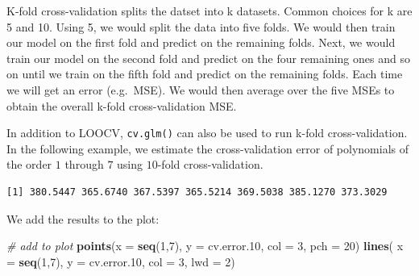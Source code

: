 \documentclass[]{article}
\newenvironment{Shaded}{\begin{snugshade}}{\end{snugshade}}
\newcommand{\CommentTok}[1]{\textcolor[rgb]{0.56,0.35,0.01}{\textit{#1}}}
\newcommand{\ControlFlowTok}[1]{\textcolor[rgb]{0.13,0.29,0.53}{\textbf{#1}}}
\newcommand{\DataTypeTok}[1]{\textcolor[rgb]{0.13,0.29,0.53}{#1}}
\newcommand{\DecValTok}[1]{\textcolor[rgb]{0.00,0.00,0.81}{#1}}
\newcommand{\FloatTok}[1]{\textcolor[rgb]{0.00,0.00,0.81}{#1}}
\newcommand{\KeywordTok}[1]{\textcolor[rgb]{0.13,0.29,0.53}{\textbf{#1}}}
\newcommand{\NormalTok}[1]{#1}
\newcommand{\OperatorTok}[1]{\textcolor[rgb]{0.81,0.36,0.00}{\textbf{#1}}}
\newcommand{\OtherTok}[1]{\textcolor[rgb]{0.56,0.35,0.01}{#1}}
\newcommand{\StringTok}[1]{\textcolor[rgb]{0.31,0.60,0.02}{#1}}
\begin{document}
K-fold cross-validation splits the datset into k datasets. Common choices for k are 5 and 10. Using 5, we would split the data into five folds. We would then train our model on the first fold and predict on the remaining folds. Next, we would train our model on the second fold and predict on the four remaining ones and so on until we train on the fifth fold and predict on the remaining folds. Each time we will get an error (e.g.~MSE). We would then average over the five MSEs to obtain the overall k-fold cross-validation MSE.

In addition to LOOCV, \texttt{cv.glm()} can also be used to run k-fold cross-validation. In the following example, we estimate the cross-validation error of polynomials of the order \(1\) through \(7\) using \(10\)-fold cross-validation.

\begin{Shaded}
\end{Shaded}

\begin{verbatim}
[1] 380.5447 365.6740 367.5397 365.5214 369.5038 385.1270 373.3029
\end{verbatim}

We add the results to the plot:

\begin{Shaded}
\begin{Highlighting}[]
\CommentTok{# add to plot}
\KeywordTok{points}\NormalTok{(}\DataTypeTok{x =} \KeywordTok{seq}\NormalTok{(}\DecValTok{1}\NormalTok{,}\DecValTok{7}\NormalTok{), }\DataTypeTok{y =}\NormalTok{ cv.error}\FloatTok{.10}\NormalTok{, }\DataTypeTok{col =} \DecValTok{3}\NormalTok{, }\DataTypeTok{pch =} \DecValTok{20}\NormalTok{)}
\KeywordTok{lines}\NormalTok{( }\DataTypeTok{x =} \KeywordTok{seq}\NormalTok{(}\DecValTok{1}\NormalTok{,}\DecValTok{7}\NormalTok{), }\DataTypeTok{y =}\NormalTok{ cv.error}\FloatTok{.10}\NormalTok{, }\DataTypeTok{col =} \DecValTok{3}\NormalTok{, }\DataTypeTok{lwd =} \DecValTok{2}\NormalTok{)}
\end{Highlighting}
\end{Shaded}
\end{document}
